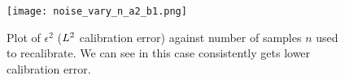 \begin{figure}
  \centering
  \texttt{[image: noise\_vary\_n\_a2\_b1.png]}
  \caption{Plot of $\epsilon^2$ ($L^2$ calibration error) against number of samples $n$ used to recalibrate. We can see in this case \ourcal{} consistently gets lower calibration error.
  }
  \label{fig:well-spec-vary-b}
\end{figure}
